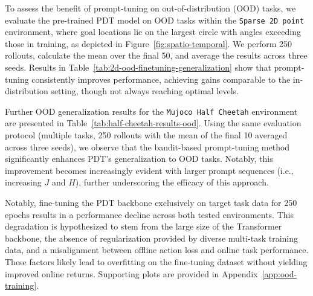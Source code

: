 \documentclass{article} %
\begin{document}
To assess the benefit of prompt-tuning on
out-of-distribution (OOD) tasks,
we evaluate the pre-trained PDT model on OOD tasks within the \texttt{Sparse 2D point} environment, where goal locations lie on the largest circle with angles exceeding those in training, as depicted in Figure~\ref{fig:spatio-temporal}. We perform 250 rollouts, calculate the mean over the final 50, and average the results across three seeds. Results in Table~\ref{tab:2d-ood-finetuning-generalization} show that prompt-tuning consistently improves performance, achieving gains comparable to the in-distribution setting, though not always reaching optimal levels.

Further OOD generalization results for the \texttt{Mujoco Half Cheetah} environment are presented in Table~\ref{tab:half-cheetah-results-ood}. Using the same evaluation protocol (multiple tasks, 250 rollouts with the mean of the final 10 averaged across three seeds), we observe that the bandit-based prompt-tuning method significantly enhances PDT's generalization to OOD tasks. Notably, this improvement becomes increasingly evident with larger prompt sequences (i.e., increasing $J$ and $H$), further underscoring the efficacy of this approach.

Notably, fine-tuning the PDT backbone exclusively on target task data for 250 epochs results in a performance decline across both tested environments. This degradation is hypothesized to stem from the large size of the Transformer backbone, the absence of regularization provided by diverse multi-task training data, and a misalignment between offline action loss and online task performance. These factors likely lead to overfitting on the fine-tuning dataset without yielding improved online returns. Supporting plots are provided in Appendix~\ref{app:ood-training}.
\end{document}
